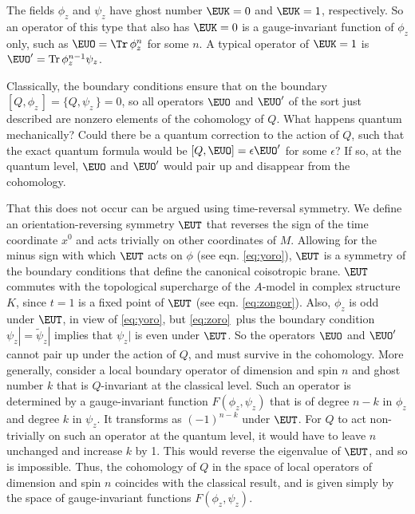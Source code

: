  The fields $\phi_z$ and $\psi_z$ have ghost number $\EUK=0$ and
 $\EUK=1$, respectively.  So an operator of this type that also has
 $\EUK=0$ is a gauge-invariant function of $\phi_z$ only, such as
 ${\EUO}=\Tr\,\phi_z^n$ for some $n$.  A typical operator of
 $\EUK=1$ is ${\EUO}'={\rm Tr}\,\phi_z^{n-1}\psi_z$.

 Classically, the boundary conditions ensure that on the boundary
 $[Q,\phi_z\,]=\{Q,\psi_z\,\}=0$, so all operators ${\EUO}$
 and ${\EUO}'$ of the sort just described are nonzero elements
 of the cohomology of $Q$.  What happens quantum mechanically?
 Could there be a quantum correction to the action of $Q$, such that the
 exact quantum formula would be $[Q,{\EUO}]=\epsilon{\EUO}'$
 for some $\epsilon$?  If so, at the quantum level, ${\EUO}$ and
 ${\EUO}'$ would pair up and disappear from the cohomology.

 That this does not occur can be argued using time-reversal
 symmetry.  We define an orientation-reversing symmetry ${\EUT}$
 that reverses the sign of the time coordinate $x^0$ and acts
 trivially on other coordinates of $M$.  Allowing for the minus
 sign with which ${\EUT}$ acts on $\phi$ (see eqn. \eqref{eq:yoro}), ${\EUT}$
 is a symmetry of the boundary conditions that define the
 canonical coisotropic brane.  ${\EUT}$ commutes with the
 topological supercharge of the $A$-model in complex structure
 $K$, since $t=1$ is a fixed point of ${\EUT}$ (see eqn. \eqref{eq:zongor}).
 Also, $\phi_z$ is odd under ${\EUT}$, in view of \eqref{eq:yoro}, but
 \eqref{eq:zoro}\
 plus the boundary condition $\psi_z|=\tilde\psi_z|$ implies that
 $\psi_z|$ is even under ${\EUT}$.  So the operators ${\EUO} $
 and ${\EUO}'$ cannot pair up under the action of $Q$, and must
 survive in the cohomology.   More generally, consider a local
 boundary operator of dimension and spin $n$ and ghost number $k$
 that is $Q$-invariant at the classical level.  Such an operator
 is determined by a gauge-invariant function $F(\phi_z,\psi_z)$
 that is of degree $n-k$ in $\phi_z$ and degree $k$ in $\psi_z$.
 It transforms as $(-1)^{n-k}$ under ${\EUT}$.   For $Q$ to act
 non-trivially on such an operator at the quantum level, it would
 have to leave $n$ unchanged and increase $k$ by 1.  This would
reverse the eigenvalue of ${\EUT}$, and so is impossible.  Thus,
the cohomology of $Q$ in the space of local operators of dimension
and spin $n$ coincides with the classical result, and is given
simply by the space of gauge-invariant functions
$F(\phi_z,\psi_z)$.
